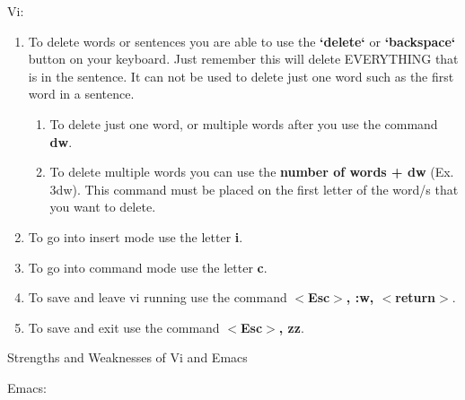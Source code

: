 \documentclass{article} %
\begin{document}
\noindent 

\noindent Vi:

\noindent 

\begin{enumerate}
\item  To delete words or sentences you are able to use the \textbf{`delete`} or \textbf{`backspace`} button on your keyboard. Just remember this will delete EVERYTHING that is in the sentence. It can not be used to delete just one word such as the first word in a sentence.

\begin{enumerate}
\item  To delete just one word, or multiple words after you use the command \textbf{dw}. 

\item  To delete multiple words you can use the \textbf{number of words + dw} (Ex. 3dw). This command must be placed on the first letter of the word/s that you want to delete. 
\end{enumerate}

\item  To go into insert mode use the letter \textbf{i}.

\item  To go into command mode use the letter \textbf{c}.

\item  To save and leave vi running use the command\textbf{ $\boldsymbol{\mathrm{<}}$Esc$\boldsymbol{\mathrm{>}}$, :w, $\boldsymbol{\mathrm{<}}$return$\boldsymbol{\mathrm{>}}$}.

\item  To save and exit use the command\textbf{ $\boldsymbol{\mathrm{<}}$Esc$\boldsymbol{\mathrm{>}}$, zz}.
\end{enumerate}

\noindent 

\noindent Strengths and Weaknesses of Vi and Emacs

\noindent 

\noindent Emacs:

\noindent 
\end{document}
